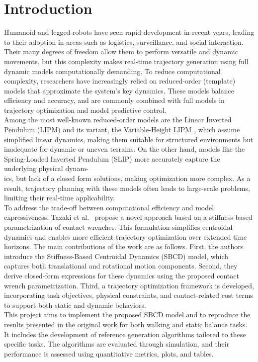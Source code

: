 \documentclass[main.tex]{subfiles}
\begin{document}
\section{Introduction}
\label{sec:introduction}
Humanoid and legged robots have seen rapid development in recent years, leading to their adoption in areas such as logistics, surveillance, and social interaction. Their many degrees of freedom allow them to perform versatile and dynamic movements, but this complexity makes real-time trajectory generation using full dynamic models computationally demanding. To reduce computational complexity, researchers have increasingly relied on reduced-order (template) models that approximate the system’s key dynamics. These models balance efficiency and accuracy, and are commonly combined with full models in trajectory optimization and model predictive control. \\
Among the most well-known reduced-order models are the Linear Inverted Pendulum (LIPM) \cite{kajita1991study} and its variant, the Variable-Height LIPM \cite{caron2020biped}, which assume simplified linear dynamics, making them suitable for structured environments but inadequate for dynamic or uneven terrains. On the other hand, models like the Spring-Loaded Inverted Pendulum (SLIP) \cite{poulakakis2009spring} more accurately capture the underlying physical dynam-\\ics, but lack of a closed form solutions, making optimization more complex. As a result, trajectory planning with these models often leads to large-scale problems, limiting their real-time applicability.\\
To address the trade-off between computational efficiency and model expressiveness, Tazaki et al.~\cite{tazaki2024trajectory} propose a novel approach based on a stiffness-based parametrization of contact wrenches. This formulation simplifies centroidal dynamics and enables more efficient trajectory optimization over extended time horizons. The main contributions of the work are as follows. First, the authors introduce the Stiffness-Based Centroidal Dynamics (SBCD) model, which captures both translational and rotational motion components. Second, they derive closed-form expressions for these dynamics using the proposed contact wrench parametrization. Third, a trajectory optimization framework is developed, incorporating task objectives, physical constraints, and contact-related cost terms to support both static and dynamic behaviors.\\
This project aims to implement the proposed SBCD model and to reproduce the results presented in the original work for both walking and static balance tasks. It includes the development of reference generation algorithms tailored to these specific tasks. The algorithms are evaluated through simulation, and their performance is assessed using quantitative metrics, plots, and tables.\\
\end{document}
